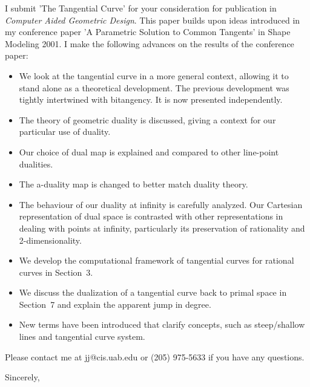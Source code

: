 \documentclass[11pt]{letter}
\begin{document}
\begin{letter}
{}

I submit 'The Tangential Curve' for your consideration
for publication in {\em Computer Aided Geometric Design}.
This paper builds upon ideas introduced in my conference paper
'A Parametric Solution to Common Tangents' 
in Shape Modeling 2001.
I make the following advances on the results of the
conference paper:

\begin{itemize}
\item   We look at the tangential curve in a more general context,
	allowing it to stand alone as a theoretical development.
	The previous development was tightly intertwined with
	bitangency.
	It is now presented independently.
\item	The theory of geometric duality is discussed, giving a context for
	our particular use of duality.
\item	Our choice of dual map is explained and 
	compared to other line-point dualities.
\item 	The a-duality map is changed to better match duality theory.
\item   The behaviour of our duality at infinity is carefully analyzed.
	Our Cartesian representation of dual space is contrasted
	with other representations in dealing with points at infinity,
	particularly its preservation of rationality and 2-dimensionality.
\item 	We develop the computational framework of tangential curves
	for rational curves in Section~3.
\item 	We discuss the dualization of a tangential curve back to primal space
	in Section~7 and explain the apparent jump in degree.
\item 	New terms have been introduced that clarify concepts,
	such as steep/shallow lines and tangential curve system.
\end{itemize}

Please contact me at jj@cis.uab.edu or (205) 975-5633
if you have any questions.

\closing{Sincerely,}

\end{letter}
\end{document}
